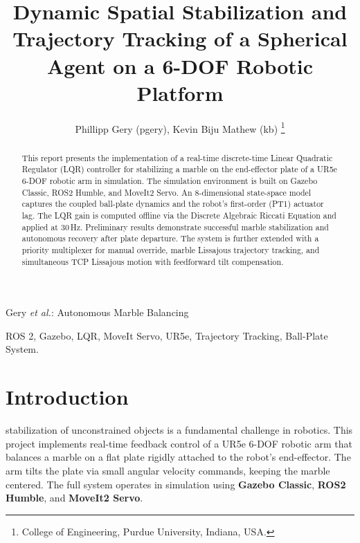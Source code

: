 \documentclass[journal]{IEEEtran}
\begin{document}
\title{Dynamic Spatial Stabilization and Trajectory Tracking of a Spherical Agent on a 6-DOF Robotic Platform}

\author{Phillipp Gery (pgery), Kevin Biju Mathew (kb)%
  \thanks{College of Engineering, Purdue University, Indiana, USA.}}

%
{Gery \MakeLowercase{\textit{et al.}}: Autonomous Marble Balancing}

\maketitle

\begin{abstract}
  This report presents the implementation of a real-time discrete-time Linear Quadratic Regulator (LQR)
  controller for stabilizing a marble on the end-effector plate of a UR5e 6-DOF robotic arm in simulation.
  The simulation environment is built on Gazebo Classic, ROS2 Humble, and MoveIt2 Servo. An 8-dimensional
  state-space model captures the coupled ball-plate dynamics and the robot's first-order (PT1) actuator lag.
  The LQR gain is computed offline via the Discrete Algebraic Riccati Equation and applied at 30\,Hz.
  Preliminary results demonstrate successful marble stabilization and autonomous recovery after plate
  departure. The system is further extended with a priority multiplexer for manual override, marble
  Lissajous trajectory tracking, and simultaneous TCP Lissajous motion with feedforward tilt compensation.
\end{abstract}

\begin{IEEEkeywords}
  ROS 2, Gazebo, LQR, MoveIt Servo, UR5e, Trajectory Tracking, Ball-Plate System.
\end{IEEEkeywords}

\section{Introduction}

 stabilization of unconstrained objects is a fundamental challenge in robotics.
This project implements real-time feedback control of a UR5e 6-DOF robotic arm that balances a marble on a
flat plate rigidly attached to the robot's end-effector. The arm tilts the plate via small angular velocity
commands, keeping the marble centered. The full system operates in simulation using
\textbf{Gazebo Classic}, \textbf{ROS2 Humble}, and \textbf{MoveIt2 Servo}.
\end{document}
